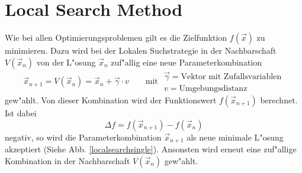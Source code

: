 	\section{Local Search Method}
		Wie bei allen Optimierungsproblemen gilt es die Zielfunktion $f(\vec{x})$ zu minimieren. Dazu wird bei der Lokalen Suchstrategie in der Nachbarschaft $V(\vec{x}_n)$ von der L"osung $\vec{x}_n$ zuf"allig eine neue Parameterkombination $$\vec{x}_{n+1} = V(\vec{x}_n) = \vec{x}_n + \vec{\gamma} \cdot v \qquad \text{mit }  \begin{matrix}\vec{\gamma} = \text{Vektor mit Zufallsvariablen}\\v = \text{Umgebungsdistanz}\end{matrix}$$ gew"ahlt. Von dieser Kombination wird der Funktionswert $f(\vec{x}_{n+1})$ berechnet. Ist dabei $$\Delta f = f(\vec{x}_{n+1}) - f(\vec{x}_{n})$$ negativ, so wird die Parameterkombination $\vec{x}_{n+1}$ als neue minimale L"osung akzeptiert (Siehe Abb. \ref{localsearchsingle}). Ansonsten wird erneut eine zuf"allige Kombination in der Nachbarschaft $V(\vec{x}_n)$ gew"ahlt.\\
